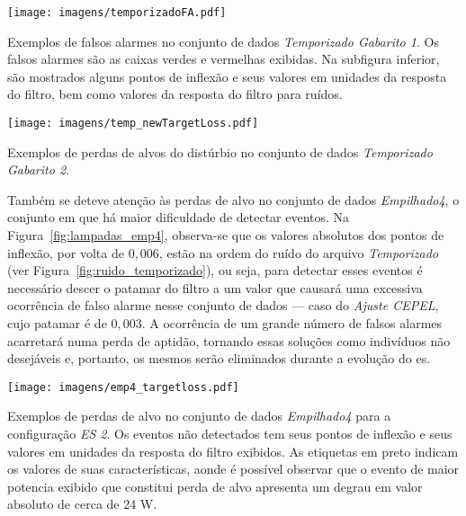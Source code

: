 \begin{SidewaysFigure}
\centering
\texttt{[image: imagens/temporizadoFA.pdf]}
\caption[Exemplos de falsos alarmes no conjunto de dados
\emph{Temporizado Gabarito 1}.]
{Exemplos de falsos alarmes no conjunto de dados \emph{Temporizado
Gabarito 1}. Os falsos alarmes são as caixas verdes e vermelhas
exibidas. Na subfigura inferior, são mostrados alguns pontos de
inflexão e seus valores em unidades da resposta do filtro, bem como
valores da resposta do filtro para ruídos.}
\label{fig:ruido_temporizado}
\end{SidewaysFigure}

\begin{SidewaysFigure}
\centering
\texttt{[image: imagens/temp\_newTargetLoss.pdf]}
\caption{Exemplos de perdas de alvos do distúrbio no conjunto de dados
\emph{Temporizado Gabarito 2}.}
\label{fig:temporizado_newTargetLoss}
\end{SidewaysFigure}

Também se deteve atenção às perdas de alvo no conjunto de dados
\emph{Empilhado4}, o conjunto em que há maior dificuldade de
detectar eventos. Na Figura~\ref{fig:lampadas_emp4},
observa-se que os valores absolutos dos pontos de inflexão,
por volta de $0,006$, estão na ordem do ruído do arquivo
\emph{Temporizado} (ver Figura~\ref{fig:ruido_temporizado}), ou seja,
para detectar esses eventos é necessário descer o patamar do filtro a
um valor que causará uma excessiva ocorrência de falso alarme
nesse conjunto de dados --- caso do \emph{Ajuste CEPEL}, cujo patamar
é de $0,003$. A ocorrência de um grande número de falsos alarmes
acarretará numa perda de aptidão, tornando essas soluções
como indivíduos não desejáveis e, portanto, os mesmos serão eliminados
durante a evolução do \acs{es}.

\begin{SidewaysFigure}
\centering
\texttt{[image: imagens/emp4\_targetloss.pdf]}
\caption[Exemplos de perdas de alvo no conjunto de dados
\emph{Empilhado4} para a configuração \emph{ES 2}] {Exemplos de perdas
de alvo no conjunto de dados \emph{Empilhado4} para a configuração
\emph{ES 2}. Os eventos não detectados tem seus pontos de inflexão e
seus valores em unidades da resposta do filtro exibidos. As etiquetas
em preto indicam os valores de suas características, aonde é possível
observar que o evento de maior potencia exibido que constitui perda de
alvo apresenta um degrau em valor absoluto de cerca de 24 W.}
\label{fig:lampadas_emp4}
\end{SidewaysFigure}

